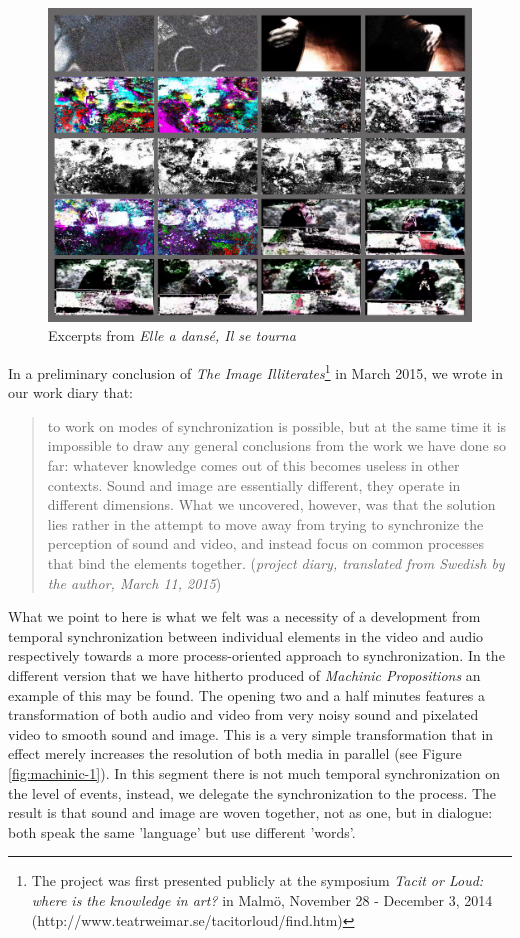 \documentclass[11pt]{article}
\begin{document}
\begin{figure}
  \label{fig:orpheus-1}
  \centering
  \includegraphics[width=\linewidth]{img/orpheus-1.jpeg}
  \caption{Excerpts from \emph{Elle a dansé, Il se tourna}}
\end{figure}
In a preliminary conclusion of \emph{The Image Illiterates}\footnote{The project was first presented publicly at the symposium \emph{Tacit or Loud: where is the knowledge in art?} in Malmö, November 28 - December 3, 2014 (http://www.teatrweimar.se/tacitorloud/find.htm)} in March 2015, we wrote in our work diary that:

\begin{quote}
  to work on modes of synchronization is possible, but at the same time it is impossible to draw any general conclusions from the work we have done so far: whatever knowledge comes out of this becomes useless in other contexts. Sound and image are essentially different, they operate in different dimensions. What we uncovered, however, was that the solution lies rather in the attempt to move away from trying to synchronize the perception of sound and video, and instead focus on common processes that bind the elements together. (\emph{project diary, translated from Swedish by the author, March 11, 2015})
\end{quote}

What we point to here is what we felt was a necessity of a development
from temporal synchronization between individual elements in the video
and audio respectively towards a more process-oriented approach to
synchronization. In the different version that we have hitherto
produced of \emph{Machinic Propositions} an example of this may be
found. The opening two and a half minutes features a transformation of both audio and video from very noisy
sound and pixelated video to smooth sound and image. This is a very simple
transformation that in effect merely increases the resolution of both
media in parallel (see Figure \ref{fig:machinic-1}). In this segment there is not much temporal
synchronization on the level of events, instead, we delegate the
synchronization to the process. The result is that sound and image are
woven together, not as one, but in dialogue: both speak the same
'language' but use different 'words'.
\end{document}
